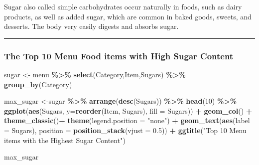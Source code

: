 \documentclass[
]{article}
\newenvironment{Shaded}{\begin{snugshade}}{\end{snugshade}}
\newcommand{\AttributeTok}[1]{\textcolor[rgb]{0.13,0.29,0.53}{#1}}
\newcommand{\DecValTok}[1]{\textcolor[rgb]{0.00,0.00,0.81}{#1}}
\newcommand{\FloatTok}[1]{\textcolor[rgb]{0.00,0.00,0.81}{#1}}
\newcommand{\FunctionTok}[1]{\textcolor[rgb]{0.13,0.29,0.53}{\textbf{#1}}}
\newcommand{\NormalTok}[1]{#1}
\newcommand{\OtherTok}[1]{\textcolor[rgb]{0.56,0.35,0.01}{#1}}
\newcommand{\SpecialCharTok}[1]{\textcolor[rgb]{0.81,0.36,0.00}{\textbf{#1}}}
\newcommand{\StringTok}[1]{\textcolor[rgb]{0.31,0.60,0.02}{#1}}
\begin{document}
Sugar also called simple carbohydrates occur naturally in foods, such as
dairy products, as well as added sugar, which are common in baked goods,
sweets, and desserts. The body very easily digests and absorbs sugar.

\begin{center}\rule{0.5\linewidth}{0.5pt}\end{center}

\hypertarget{the-top-10-menu-food-items-with-high-sugar-content}{%
\subsubsection{The Top 10 Menu Food items with High Sugar
Content}\label{the-top-10-menu-food-items-with-high-sugar-content}}

\begin{Shaded}
\begin{Highlighting}[]
\NormalTok{sugar }\OtherTok{\textless{}{-}}\NormalTok{ menu }\SpecialCharTok{\%\textgreater{}\%}
  \FunctionTok{select}\NormalTok{(Category,Item,Sugars) }\SpecialCharTok{\%\textgreater{}\%} 
  \FunctionTok{group\_by}\NormalTok{(Category)}

\NormalTok{max\_sugar }\OtherTok{\textless{}{-}}\NormalTok{sugar }\SpecialCharTok{\%\textgreater{}\%} 
  \FunctionTok{arrange}\NormalTok{(}\FunctionTok{desc}\NormalTok{(Sugars)) }\SpecialCharTok{\%\textgreater{}\%} 
  \FunctionTok{head}\NormalTok{(}\DecValTok{10}\NormalTok{) }\SpecialCharTok{\%\textgreater{}\%} 
  \FunctionTok{ggplot}\NormalTok{(}\FunctionTok{aes}\NormalTok{(Sugars,}
             \AttributeTok{y=}\FunctionTok{reorder}\NormalTok{(Item,}
\NormalTok{                       Sugars),}
             \AttributeTok{fill =}\NormalTok{ Sugars)) }\SpecialCharTok{+}
  \FunctionTok{geom\_col}\NormalTok{() }\SpecialCharTok{+} 
  \FunctionTok{theme\_classic}\NormalTok{()}\SpecialCharTok{+}
  \FunctionTok{theme}\NormalTok{(}\AttributeTok{legend.position =} \StringTok{"none"}\NormalTok{) }\SpecialCharTok{+}
  \FunctionTok{geom\_text}\NormalTok{(}\FunctionTok{aes}\NormalTok{(}\AttributeTok{label =}\NormalTok{ Sugars),}
            \AttributeTok{position =} \FunctionTok{position\_stack}\NormalTok{(}\AttributeTok{vjust =} \FloatTok{0.5}\NormalTok{)) }\SpecialCharTok{+} \FunctionTok{ggtitle}\NormalTok{(}\StringTok{"Top 10 Menu items with the Highest Sugar Content"}\NormalTok{)}


\NormalTok{max\_sugar}
\end{Highlighting}
\end{Shaded}
\end{document}

